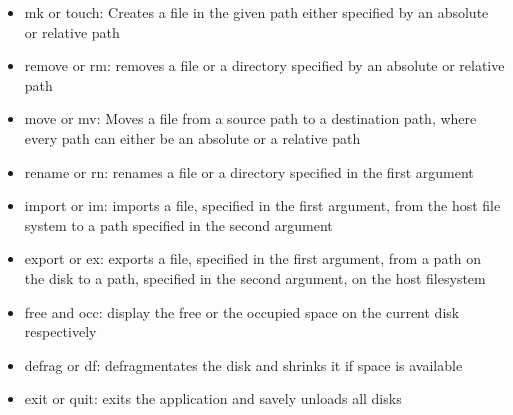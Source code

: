 \documentclass{report}
\begin{document}
\begin{itemize}
\item mk or touch: Creates a file in the given path either specified by an absolute or relative path
\item remove or rm: removes a file or a directory specified by an absolute or relative path
\item move or mv: Moves a file from a source path to a destination path, where every path can either be an absolute or a relative path
\item rename or rn: renames a file or a directory specified in the first argument
\item import or im: imports a file, specified in the first argument, from the host file system to a path specified in the second argument
\item export or ex: exports a file, specified in the first argument, from a path on the disk to a path, specified in the second argument, on the host filesystem
\item free and occ: display the free or the occupied space on the current disk respectively
\item defrag or df: defragmentates the disk and shrinks it if space is available
\item exit or quit: exits the application and savely unloads all disks
\end{itemize}
\end{document}
